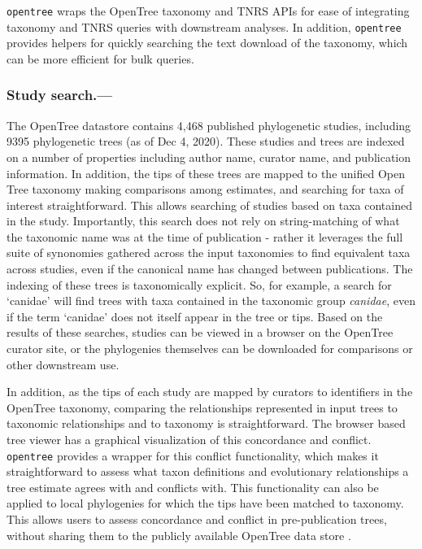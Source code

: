\documentclass[oupdraft]{sysbio_sse}
\begin{document}
\texttt{opentree} wraps the OpenTree taxonomy and TNRS APIs for ease of integrating taxonomy and TNRS queries with downstream analyses. In addition, \texttt{opentree} provides helpers for quickly searching the text download of the taxonomy, which can be more efficient for bulk queries.


\subsubsection{Study search.---} The OpenTree datastore contains 4,468 published phylogenetic studies, including 9395 phylogenetic trees (as of Dec 4, 2020).
These studies and trees are indexed on a number of properties including author name, curator name, and publication information. 
In addition, the tips of these trees are mapped to the unified Open Tree taxonomy making comparisons among estimates, and searching for taxa of interest straightforward.
This allows searching of studies based on taxa contained in the study.
Importantly, this search does not rely on string-matching of what the taxonomic name was at the time of publication - rather it leverages the full suite of synonomies gathered across the input taxonomies to find equivalent taxa across studies, even if the canonical name has changed between publications.
The indexing of these trees is taxonomically explicit.
So, for example, a search for `canidae' will find trees with taxa contained in the taxonomic group \textit{canidae}, even if the term `canidae' does not itself appear in the tree or tips.
Based on the results of these searches, studies can be viewed in a browser on the OpenTree curator site, or the phylogenies themselves can be downloaded for comparisons or other downstream use.

In addition, as the tips of each study are mapped by curators to identifiers in the OpenTree taxonomy, comparing the relationships represented in input trees to taxonomic relationships and to taxonomy is straightforward. The browser based tree viewer has a graphical visualization of this concordance and conflict. \texttt{opentree} provides a wrapper for this conflict functionality, which makes it straightforward to assess what taxon definitions and evolutionary relationships a tree estimate agrees with and conflicts with. This functionality can also be applied to local phylogenies for which the tips have been matched to taxonomy. This allows users to assess concordance and conflict in pre-publication trees, without sharing them to the publicly available OpenTree data store \citep{reyes_physcraper_2020, mctavish_phylesystem_2015}.
\end{document}
